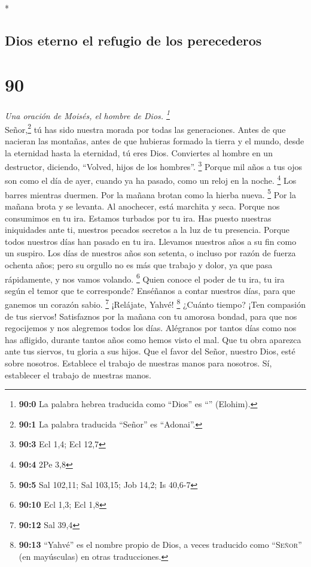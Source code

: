 \begin{paracol}{2}
\begin{otherlanguage}{english}
\end{otherlanguage}

\switchcolumn[0]*

\hypertarget{dios-eterno-el-refugio-de-los-perecederos}{%
\subsection{Dios eterno el refugio de los
perecederos}\label{dios-eterno-el-refugio-de-los-perecederos}}

\hypertarget{section-178}{%
\section{90}\label{section-178}}

\emph{Una oración de Moisés, el hombre de Dios. \footnote{\textbf{90:0}
  La palabra hebrea traducida como ``Dios'' es ``''
  (Elohim).}}\\
 Señor,\footnote{\textbf{90:1} La palabra traducida
  ``Señor'' es ``Adonai''.} tú has sido nuestra morada por todas las
generaciones.  Antes de que nacieran las montañas, antes
de que hubieras formado la tierra y el mundo, desde la eternidad hasta
la eternidad, tú eres Dios.  Conviertes al hombre en un
destructor, diciendo, ``Volved, hijos de los hombres''. \footnote{\textbf{90:3}
  Ecl 1,4; Ecl 12,7}  Porque mil años a tus ojos son como
el día de ayer, cuando ya ha pasado, como un reloj en la noche.
\footnote{\textbf{90:4} 2Pe 3,8}  Los barres mientras
duermen. Por la mañana brotan como la hierba nueva. \footnote{\textbf{90:5}
  Sal 102,11; Sal 103,15; Job 14,2; Is 40,6-7}  Por la
mañana brota y se levanta. Al anochecer, está marchita y seca.
 Porque nos consumimos en tu ira. Estamos turbados por tu
ira.  Has puesto nuestras iniquidades ante ti, nuestros
pecados secretos a la luz de tu presencia.  Porque todos
nuestros días han pasado en tu ira. Llevamos nuestros años a su fin como
un suspiro.  Los días de nuestros años son setenta, o
incluso por razón de fuerza ochenta años; pero su orgullo no es más que
trabajo y dolor, ya que pasa rápidamente, y nos vamos volando.
\footnote{\textbf{90:10} Ecl 1,3; Ecl 1,8}  Quien conoce
el poder de tu ira, tu ira según el temor que te corresponde?
 Enséñanos a contar nuestros días, para que ganemos un
corazón sabio. \footnote{\textbf{90:12} Sal 39,4} 
¡Relájate, Yahvé! \footnote{\textbf{90:13} ``Yahvé'' es el nombre propio
  de Dios, a veces traducido como ``\textsc{Señor}'' (en mayúsculas) en
  otras traducciones.} ¿Cuánto tiempo? ¡Ten compasión de tus siervos!
 Satisfaznos por la mañana con tu amorosa bondad, para
que nos regocijemos y nos alegremos todos los días. 
Alégranos por tantos días como nos has afligido, durante tantos años
como hemos visto el mal.  Que tu obra aparezca ante tus
siervos, tu gloria a sus hijos.  Que el favor del Señor,
nuestro Dios, esté sobre nosotros. Establece el trabajo de nuestras
manos para nosotros. Sí, establecer el trabajo de nuestras manos.


\end{paracol}
